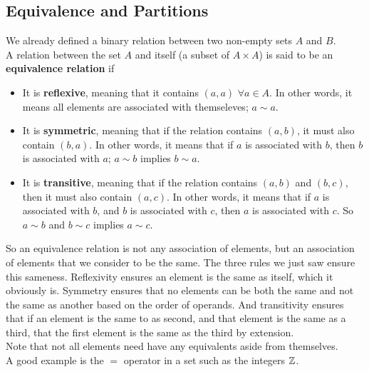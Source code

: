 \documentclass[12pt]{article}
\begin{document}
    \subsection*{Equivalence and Partitions}
    We already defined a binary relation between two non-empty sets
    $A$ and $B$. \\
    A relation between the set $A$ and itself 
    (a subset of $A \times A$)
    is said to be an \textbf{equivalence relation} if 
    \begin{itemize}[label=$\diamond$]
        \item 
            It is \textbf{reflexive},
            meaning that it contains $(a, a)$ $\forall a \in A$.
            In other words, it means all elements are
            associated with themseleves; $a \sim a$.
        \item 
            It is \textbf{symmetric},
            meaning that if the relation contains $(a, b)$,
            it must also contain $(b, a)$. 
            In other words, it means that if $a$ is associated
            with $b$, then $b$ is associated with $a$;
            $a \sim b$ implies $b \sim a$.
        \item
            It is \textbf{transitive},
            meaning that if the relation contains $(a, b)$
            and $(b, c)$,
            then it must also contain $(a, c)$.
            In other words, it means that if $a$ is associated
            with $b$, and $b$ is associated with $c$,
            then $a$ is associated with $c$.
            So $a \sim b$ and $b \sim c$ implies $a \sim c$.
    \end{itemize} 
    So an equivalence relation is not any association of elements,
    but an association of elements that we consider to be the same.
    The three rules we just saw ensure this sameness.
    Reflexivity ensures an element is the same as itself,
    which it obviously is.
    Symmetry ensures that no elements can be both the same
    and not the same as another based on the order of operands.
    And transitivity ensures that if an element is the same to as second,
    and that element is the same as a third,
    that the first element is the same as the third by extension. \\
    Note that not all elements need have any equivalents
    aside from themselves. \\
    A good example is the $=$ operator in a set
    such as the integers $\mathbb{Z}$. \\
    
\end{document}
